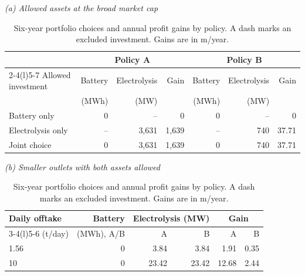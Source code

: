 \begin{table}[H]
\centering\small
\caption{Six-year portfolio choices and annual profit gains by policy.
A dash marks an excluded investment. Gains are in \gbp m/year.}
\label{tab:annual}
\textit{(a) Allowed assets at the broad market cap}\par\vspace{2pt}
\begin{tabular}{@{}l r r r r r r@{}}
\toprule
 & \multicolumn{3}{c}{Policy A} & \multicolumn{3}{c}{Policy B} \\
\cmidrule(lr){2-4}\cmidrule(l){5-7}
Allowed investment & Battery & Electrolysis & Gain & Battery & Electrolysis & Gain \\
 & (MWh) & (MW) & & (MWh) & (MW) & \\
\midrule
Battery only & 0 & -- & 0 & 0 & -- & 0 \\
Electrolysis only & -- & 3,631 & 1,639 & -- & 740 & 37.71 \\
Joint choice & 0 & 3,631 & 1,639 & 0 & 740 & 37.71 \\
\bottomrule
\end{tabular}
\par\vspace{5pt}
\textit{(b) Smaller outlets with both assets allowed}\par\vspace{2pt}
\begin{tabular}{@{}l r r r r r@{}}
\toprule
Daily offtake & Battery & \multicolumn{2}{c}{Electrolysis (MW)} &
 \multicolumn{2}{c}{Gain} \\
\cmidrule(lr){3-4}\cmidrule(l){5-6}
(t/day) & (MWh), A/B & A & B & A & B \\
\midrule
1.56 & 0 & 3.84 & 3.84 & 1.91 & 0.35 \\
10 & 0 & 23.42 & 23.42 & 12.68 & 2.44 \\
\bottomrule
\end{tabular}
\end{table}
